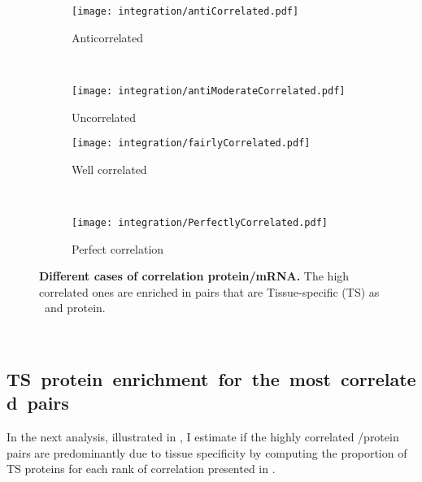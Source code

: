\begin{figure}[!htb]
    \begin{subfigure}[h]{0.5\textwidth}
        \centering \texttt{[image: integration/antiCorrelated.pdf]}
        \caption{Anticorrelated}\label{fig:caseAnticor}
    \end{subfigure}~%
    \begin{subfigure}[h]{0.5\textwidth}
        \centering \texttt{[image: integration/antiModerateCorrelated.pdf]}
        \caption{Uncorrelated}\label{fig:caseUncor}
    \end{subfigure}
    \vspace{2mm}

    \begin{subfigure}[h]{0.5\textwidth}
        \centering \texttt{[image: integration/fairlyCorrelated.pdf]}
        \caption{Well correlated}\label{fig:caseFairlyCor}
    \end{subfigure}~%
    \begin{subfigure}[h]{0.5\textwidth}
        \centering \texttt{[image: integration/PerfectlyCorrelated.pdf]}
        \caption{Perfect correlation}\label{fig:casePerfectlyCor}
    \end{subfigure}
    \caption[Different cases of correlation
    protein/mRNA]{\label{fig:caseGene}\textbf{Different cases of correlation
    protein/mRNA.} The high correlated ones are enriched in pairs that are
    Tissue-specific (TS) as \mRNA\ and protein.}
\end{figure}

\FloatBarrier\

\subsection{TS~protein~enrichment~for~the~most~correlated~pairs}
\vspace{-5mm}
In the next analysis, illustrated in ,
I estimate if the highly correlated \mRNA/protein pairs
are predominantly due to tissue specificity
by computing the proportion of \gls{TS} proteins
for each rank of correlation presented in .

